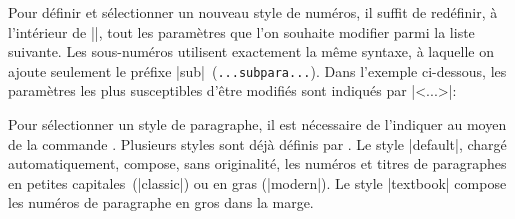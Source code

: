 Pour définir et sélectionner un nouveau style de numéros, il suffit de redéfinir, à l'intérieur de |\makeparastyle|, tout les paramètres que l'on souhaite modifier parmi la liste suivante. Les sous-numéros utilisent exactement la même syntaxe, à laquelle on ajoute seulement le préfixe |sub|~(\texttt{...subpara...}). Dans l'exemple ci-dessous, les paramètres les plus susceptibles d'être modifiés sont indiqués par |<...>|:

\begin{macro}
\end{macro}

\begin{noprint}
\newcommand{\paraskip}{}
\newcommand{\parasep}{}
\newcommand{\paranumsep}{}
\newcommand{\paracolour}{}
\newcommand{\paranumcolour}{}
\newcommand{\paratitlestyle}[1]{#1}
\newcommand{\paranumstyle}[1]{#1}

\newcommand{\subparaskip}{}
\newcommand{\subparasep}{}
\newcommand{\subparanumsep}{}
\newcommand{\subparanumdash}{}
\newcommand{\subparacolour}{}
\newcommand{\subparanumcolour}{}
\newcommand{\subparatitlestyle}[1]{#1}
\newcommand{\subparanumstyle}[1]{#1}
\end{noprint}


Pour sélectionner un style de paragraphe, il est nécessaire de l'indiquer au moyen de la commande . Plusieurs styles sont déjà définis par \frenchlaw. Le style |default|, chargé automatiquement, compose, sans originalité, les numéros et titres de paragraphes en petites capitales~(|classic|) ou en gras (|modern|). Le style |textbook| compose les numéros de paragraphe en gros dans la marge.

